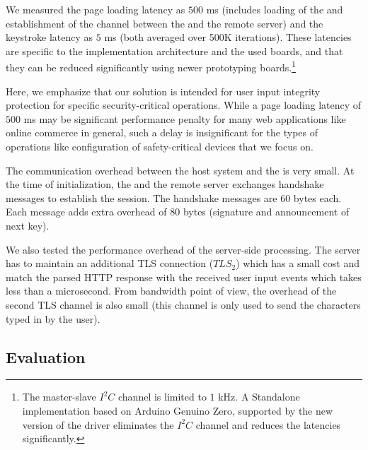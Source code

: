 We measured the page loading latency as $500$ ms (includes loading of the \webusb \js and establishment of the \tls channel between the \device and the remote server) and the keystroke latency as $5$ ms (both averaged over 500K iterations). These latencies are specific to the implementation architecture and the used boards, and that they can be reduced significantly using newer prototyping boards.\footnote{The master-slave $I^2C$ channel is limited to $1$ kHz. A Standalone implementation based on Arduino Genuino Zero, supported by the new version of the \webusb driver eliminates the $I^2C$ channel and reduces the latencies significantly.} 

Here, we emphasize that our solution is intended for user input integrity protection for specific security-critical operations. While a page loading latency of $500$ ms may be significant performance penalty for many web applications like online commerce in general, such a delay is insignificant for the types of operations like configuration of safety-critical devices that we focus on.

The communication overhead between the host system and the \device is very small. At the time of initialization, the \device and the remote server exchanges \tls handshake messages to establish the session. The handshake messages are $60$ bytes each. Each \tls message adds extra overhead of $80$ bytes (signature and announcement of next key). 

We also tested the performance overhead of the server-side processing. The server has to maintain an additional TLS connection ($TLS_2$) which has a small cost and match the parsed HTTP response with the received user input events which takes less than a microsecond. 
From bandwidth point of view, the overhead of the second TLS channel is also small (this channel is only used to send the characters typed in by the user).

\subsection{\tool Evaluation} 
\label{sec:results:framework}

